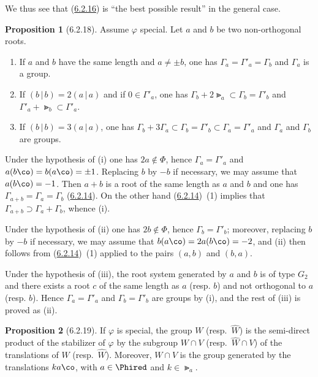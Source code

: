 \documentclass[12pt,a4paper,oneside,english]{smfart}
\makeatletter
\newcommand{\btanchor}[1]{\leavevmode\Hy@raisedlink{\hypertarget{bt:#1}{}}}
\newcommand{\btref}[1]{\hyperlink{bt:#1}{#1}}
\theoremstyle{definition}
\theoremstyle{bt}
\newtheorem{prop}{Proposition}
\makeatother
\begin{document}
We thus see that (\btref{6.2.16}) is ``the best possible result'' in the general
case.

\begin{prop}[6.2.18]\btanchor{6.2.18}
Assume $\varphi$ special. Let $a$ and $b$ be two non-orthogonal roots.
\begin{enumerate}[label=(\roman*),leftmargin=2.2em]
\item If $a$ and $b$ have the same length and $a\neq\pm b$, one has
      $\Gamma_a=\Gamma'_a=\Gamma_b$ and $\Gamma_a$ is a group.
\item If $(b\,|\,b)=2(a\,|\,a)$ and if $0\in\Gamma'_a$, one has
      $\Gamma_b+2\Gt_a\subset\Gamma_b=\Gamma'_b$ and
      $\Gamma'_a+\Gt_b\subset\Gamma'_a$.
\item If $(b\,|\,b)=3(a\,|\,a)$, one has
      $\Gamma_b+3\Gamma_a\subset\Gamma_b=\Gamma'_b\subset\Gamma_a=\Gamma'_a$
      and $\Gamma_a$ and $\Gamma_b$ are groups.
\end{enumerate}
\end{prop}

Under the hypothesis of (i) one has $2a\notin\Phi$, hence
$\Gamma_a=\Gamma'_a$ and $a(b\co)=b(a\co)=\pm1$. Replacing $b$ by $-b$ if
necessary, we may assume that $a(b\co)=-1$. Then $a+b$ is a root of the
same length as $a$ and $b$ and one has $\Gamma_{a+b}=\Gamma_a=\Gamma_b$
(\btref{6.2.14}). On the other hand (\btref{6.2.14})~(1) implies that
$\Gamma_{a+b}\supset\Gamma_a+\Gamma_b$, whence (i).

Under the hypothesis of (ii) one has $2b\notin\Phi$, hence
$\Gamma_b=\Gamma'_b$; moreover, replacing $b$ by $-b$ if necessary, we may
assume that $b(a\co)=2a(b\co)=-2$, and (ii) then follows from (\btref{6.2.14})~(1)
applied to the pairs $(a,b)$ and $(b,a)$.

Under the hypothesis of (iii), the root system generated by $a$ and $b$ is
of type $G_2$ and there exists a root $c$ of the same length as $a$ (resp.
$b$) and not orthogonal to $a$ (resp. $b$). Hence $\Gamma_a=\Gamma'_a$ and
$\Gamma_b=\Gamma'_b$ are groups by (i), and the rest of (iii) is proved as
(ii).

\begin{prop}[6.2.19]\btanchor{6.2.19}
If $\varphi$ is special, the group $W$ (resp.\ $\widehat{W}$) is the
semi-direct product of the stabilizer of $\varphi$ by the subgroup $W\cap V$
(resp.\ $\widehat{W}\cap V$) of the translations of $W$ (resp.\
$\widehat{W}$). Moreover, $W\cap V$ is the group generated by the
translations $ka\co$, with $a\in\Phired$ and $k\in\Gt_a$.
\end{prop}
\end{document}
